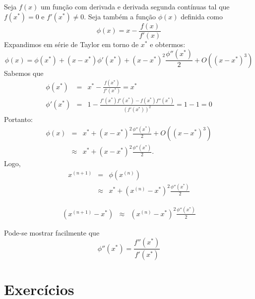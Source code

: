 Seja $f(x)$ um função com derivada e derivada segunda contínuas tal que $f(x^*)=0$ e $f'(x^*)\neq 0$. Seja também a função $\phi(x)$ definida como
$$\phi(x)=x-\frac{f(x)}{f'(x)}$$
Expandimos em série de Taylor em torno de $x^*$ e obtermos:
$$\phi(x)=\phi(x^*)+(x-x^*)\phi'(x^*)+ (x-x^*)^2\frac{\phi''(x^*)}{2}+O\left((x-x^*)^3\right)$$
Sabemos que
\begin{eqnarray*}
\phi(x^*)&=&x^*-\frac{f(x^*)}{f'(x^*)}=x^*\\
\phi'(x^*)&=&1-\frac{f'(x^*)f'(x^*)-f(x^*)f''(x^*)}{\left(f'(x^*)\right)^2}=1-1=0
\end{eqnarray*}
Portanto:
\begin{eqnarray*}
\phi(x)&=&x^*+ (x-x^*)^2\frac{\phi''(x^*)}{2}+O\left((x-x^*)^3\right)\\
&\approx&x^*+ (x-x^*)^2\frac{\phi''(x^*)}{2}.
\end{eqnarray*}
Logo,
\begin{eqnarray*}
x^{(n+1)}&=&\phi(x^{(n)})\\
&\approx& x^*+ (x^{(n)}-x^*)^2\frac{\phi''(x^*)}{2}
\end{eqnarray*}

\begin{eqnarray*}
\left(x^{(n+1)}-x^*\right) &\approx& (x^{(n)}-x^*)^2\frac{\phi''(x^*)}{2}
\end{eqnarray*}

\begin{obs} Pode-se mostrar facilmente que
$$\phi''(x^*)=\frac{f''(x^*)}{f'(x^*)}$$
\end{obs}

\section*{Exercícios}

